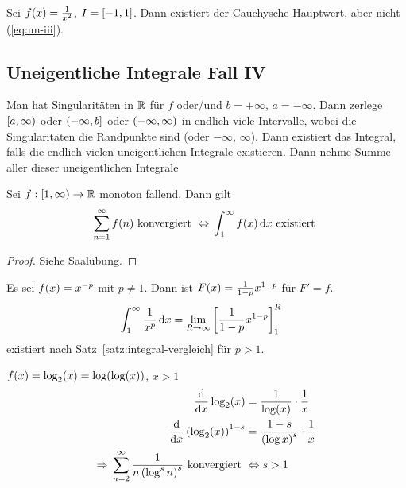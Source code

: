 \begin{beispiel}
    Sei $f\of{x} = \frac{1}{x^2}$, $I=\left[-1, 1\right]$. Dann existiert der Cauchysche Hauptwert, aber nicht (\ref{eq:un-iii}).
\end{beispiel}

\subsection{Uneigentliche Integrale Fall IV}

\begin{definition}
    Man hat Singularitäten in $\mathbb{R}$ für $f$ oder/und $b=+\infty$, $a=-\infty$. Dann zerlege $\left[a, \infty\right)$ oder $\left(-\infty, b\right]$ oder $\left(-\infty, \infty\right)$ in endlich viele Intervalle, wobei die Singularitäten die Randpunkte sind (oder $-\infty$, $\infty$). Dann existiert das Integral, falls die endlich vielen uneigentlichen Integrale existieren. Dann nehme Summe aller dieser uneigentlichen Integrale
\end{definition}

\begin{satz}[Integralvergleichskriterium] %
    \label{satz:integral-vergleich}
    Sei $f: \left[1, \infty\right) \rightarrow{}\mathbb{R}$ monoton fallend. Dann gilt
    \begin{align*}
        \sum_{n=1}^{\infty}  f\of{n} \text{ konvergiert } \equivalent \int_{1}^{\infty} f\of{x} \dif x \text{ existiert }
    \end{align*}
    \begin{proof}
        Siehe Saalübung.
    \end{proof}
\end{satz}

\begin{beispiel}
    Es sei $f\of{x} = x^{-p}$ mit $p\neq 1$. Dann ist $F\of{x} = \frac{1}{1-p}x^{1-p}$ für $F'=f$.
    \begin{align*}
        \int_{1}^{\infty} \frac{1}{x^p} \mathop{}\!\mathrm{d} x &= \lim_{R\rightarrow{}\infty} \left[\frac{1}{1-p}x^{1-p}\right]_1^R
    \end{align*}
    existiert nach Satz~\ref{satz:integral-vergleich} für $p>1$.
\end{beispiel}

\begin{beispiel}
    $f\of{x} = \log_2\of{x} = \log\of{\log\of{x}}$, $x > 1$
    \begin{align*}
        \frac{\dif}{\dif x} \log_2\of{x} &= \frac{1}{\log\of{x}}\cdot\frac{1}{x}\\
        \frac{\dif}{\dif x}\pair{\log_2\of{x}}^{1-s} &= \frac{1-s}{\pair{\log x}^s}\cdot \frac{1}{x}\\
        \impl \sum_{n=2}^{\infty} \frac{1}{n\pair{\log^s n}^s} \text{ konvergiert } &\equivalent s > 1
    \end{align*}
\end{beispiel}

